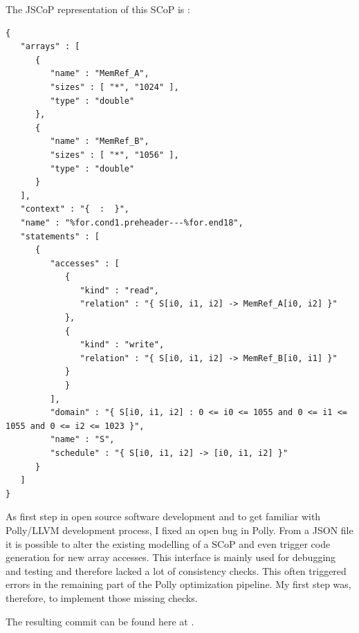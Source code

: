 The JSCoP representation of this SCoP is :
\begin{lstlisting}[frame=single]
{
   "arrays" : [
      {
         "name" : "MemRef_A",
         "sizes" : [ "*", "1024" ],
         "type" : "double"
      },
      {
         "name" : "MemRef_B",
         "sizes" : [ "*", "1056" ],
         "type" : "double"
      }
   ],
   "context" : "{  :  }",
   "name" : "%for.cond1.preheader---%for.end18",
   "statements" : [
      {
         "accesses" : [
            {
               "kind" : "read",
               "relation" : "{ S[i0, i1, i2] -> MemRef_A[i0, i2] }"
            },
            {
               "kind" : "write",
               "relation" : "{ S[i0, i1, i2] -> MemRef_B[i0, i1] }"
            }
            }
         ],
         "domain" : "{ S[i0, i1, i2] : 0 <= i0 <= 1055 and 0 <= i1 <= 1055 and 0 <= i2 <= 1023 }",
         "name" : "S",
         "schedule" : "{ S[i0, i1, i2] -> [i0, i1, i2] }"
      }
   ]
}
\end{lstlisting}

As first step in open source software development and to get familiar with Polly/LLVM development process, I fixed an open bug in Polly. From a JSON file it is possible to alter the existing modelling of a SCoP and even trigger code generation for new array accesses. This interface is mainly used for debugging and testing and therefore lacked a lot of consistency checks. This often triggered errors in the remaining part of the Polly optimization pipeline. My first step was, therefore, to implement those missing checks.

The resulting commit can be found here at .
